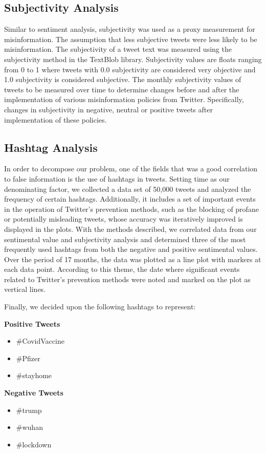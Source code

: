 \documentclass[10pt,twocolumn,letterpaper]{article}
\begin{document}
\subsection{Subjectivity Analysis}
Similar to sentiment analysis, subjectivity was used as a proxy measurement for misinformation. The assumption that less subjective tweets were less likely to be misinformation. The subjectivity of a tweet text was measured using the subjectivity method in the TextBlob library. Subjectivity values are floats ranging from 0 to 1 where tweets with 0.0 subjectivity are considered very objective and 1.0 subjectivity is considered subjective. The monthly subjectivity values of tweets to be measured over time to determine changes before and after the implementation of various misinformation policies from Twitter. Specifically, changes in subjectivity in negative, neutral or positive tweets after implementation of these policies.

\subsection{Hashtag Analysis}
In order to decompose our problem, one of the fields that was a good correlation to false information is the use of hashtags in tweets. Setting time as our denominating factor, we collected a data set of 50,000 tweets\cite{kash_2021} and analyzed the frequency of certain hashtags. Additionally, it includes a set of important events in the operation of Twitter’s prevention methods, such as the blocking of profane or potentially misleading tweets, whose accuracy was iteratively improved is displayed in the plots.
With the methods described, we correlated data from our sentimental value and subjectivity analysis and determined three of the most frequently used hashtags from both the negative and positive sentimental values. Over the period of 17 months, the data was plotted as a line plot with markers at each data point\cite{github_2021}. According to this theme, the date where significant events related to Twitter’s prevention methods\cite{inc._2021} were noted and marked on the plot as vertical lines.

Finally, we decided upon  the following hashtags to represent:

\begin{multicols}{2}
\textbf{Positive Tweets} 
\begin{itemize}
  \item \#CovidVaccine
  \item \#Pfizer
  \item \#stayhome
\end{itemize}

\columnbreak

\textbf{Negative Tweets} 
\begin{itemize}
  \item \#trump
  \item \#wuhan
  \item \#lockdown
\end{itemize}
\end{multicols}
\end{document}
